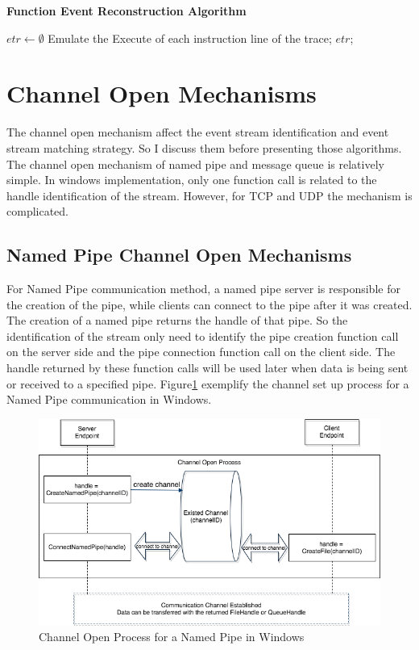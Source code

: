 \begin{algorithm}[H]
\DontPrintSemicolon
\caption{{\bf Function Event Reconstruction Algorithm} \label{eventAlg}}
$etr \leftarrow \emptyset$\; 
Emulate the Execute of each instruction line of the trace;\;
\KwRet $etr$;\;
\end{algorithm} 

\section{Channel Open Mechanisms}\label{mecha}
The channel open mechanism affect the event stream identification and event stream matching strategy. So I discuss them before presenting those algorithms. The channel open mechanism of named pipe and message queue is relatively simple. In windows implementation, only one function call is related to the handle identification of the stream. However, for TCP and UDP the mechanism is complicated.

\subsection{Named Pipe Channel Open Mechanisms} 
For Named Pipe communication method, a named pipe server is responsible for the creation of the pipe, while clients can connect to the pipe after it was created. The creation of a named pipe returns the handle of that pipe. So the identification of the stream only need to identify the pipe creation function call on the server side and the pipe connection function call on the client side. The handle returned by these function calls will be used later when data is being sent or received to a specified pipe. Figure\ref{namedpipeopen} exemplify the channel set up process for a Named Pipe communication in Windows. 

\begin{figure}[H]
\centerline{\includegraphics[scale=0.5]{Figures/namepipechannelopen}}
 \caption{Channel Open Process for a Named Pipe in Windows}
\label{namedpipeopen}
\end{figure}
    
